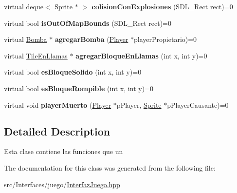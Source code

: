 \begin{DoxyCompactItemize}
\item 
virtual deque$<$ \hyperlink{class_sprite}{Sprite} $\ast$ $>$ {\bfseries colision\+Con\+Explosiones} (S\+D\+L\+\_\+\+Rect rect)=0\hypertarget{class_interfaz_juego_adf29f16f79645436c70efef98b522608}{}\label{class_interfaz_juego_adf29f16f79645436c70efef98b522608}

\item 
virtual bool {\bfseries is\+Out\+Of\+Map\+Bounds} (S\+D\+L\+\_\+\+Rect rect)=0\hypertarget{class_interfaz_juego_a4a7543a340f74cff355aa900329f5c89}{}\label{class_interfaz_juego_a4a7543a340f74cff355aa900329f5c89}

\item 
virtual \hyperlink{class_bomba}{Bomba} $\ast$ {\bfseries agregar\+Bomba} (\hyperlink{class_player}{Player} $\ast$player\+Propietario)=0\hypertarget{class_interfaz_juego_a51f9c4d2cbb8d897bae5f201e5e800c1}{}\label{class_interfaz_juego_a51f9c4d2cbb8d897bae5f201e5e800c1}

\item 
virtual \hyperlink{class_tile_en_llamas}{Tile\+En\+Llamas} $\ast$ {\bfseries agregar\+Bloque\+En\+Llamas} (int x, int y)=0\hypertarget{class_interfaz_juego_a9acf8fb9f782d448043535d553fb7535}{}\label{class_interfaz_juego_a9acf8fb9f782d448043535d553fb7535}

\item 
virtual bool {\bfseries es\+Bloque\+Solido} (int x, int y)=0\hypertarget{class_interfaz_juego_ac4c1573e92f587b81843e7cab25e2581}{}\label{class_interfaz_juego_ac4c1573e92f587b81843e7cab25e2581}

\item 
virtual bool {\bfseries es\+Bloque\+Rompible} (int x, int y)=0\hypertarget{class_interfaz_juego_a3fb994485276a791e67e7d4290c1ea34}{}\label{class_interfaz_juego_a3fb994485276a791e67e7d4290c1ea34}

\item 
virtual void {\bfseries player\+Muerto} (\hyperlink{class_player}{Player} $\ast$p\+Player, \hyperlink{class_sprite}{Sprite} $\ast$p\+Player\+Causante)=0\hypertarget{class_interfaz_juego_a8a696b1e5b7998e786e3537788f4c9a6}{}\label{class_interfaz_juego_a8a696b1e5b7998e786e3537788f4c9a6}

\end{DoxyCompactItemize}


\subsection{Detailed Description}
Esta clase contiene las funciones que un 

The documentation for this class was generated from the following file\+:\begin{DoxyCompactItemize}
\item 
src/\+Interfaces/juego/\hyperlink{_interfaz_juego_8hpp}{Interfaz\+Juego.\+hpp}\end{DoxyCompactItemize}
